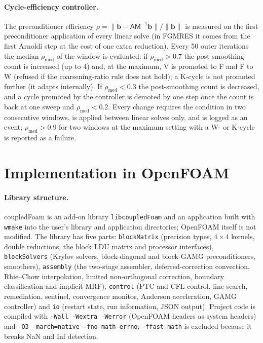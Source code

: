 \documentclass[11pt,a4paper]{article}
\newcommand{\vect}[1]{\mathbf{#1}}
\newcommand{\code}[1]{\texttt{#1}}
\begin{document}
\paragraph{Cycle-efficiency controller.} The preconditioner efficiency
$\rho=\|\vect b-\mathsf A\mathsf M^{-1}\vect b\|/\|\vect b\|$ is measured on the
first preconditioner application of every linear solve (in FGMRES it comes
from the first Arnoldi step at the cost of one extra reduction). Every 50
outer iterations the median $\rho_{\mathrm{med}}$ of the window is evaluated:
if $\rho_{\mathrm{med}}>0.7$ the post-smoothing count is increased (up to 4)
and, at the maximum, V is promoted to F and F to W (refused if the
coarsening-ratio rule does not hold); a K-cycle is not promoted further
(it adapts internally). If $\rho_{\mathrm{med}}<0.3$ the post-smoothing count
is decreased, and a cycle promoted by the controller is demoted by one step
once the count is back at one sweep and $\rho_{\mathrm{med}}<0.2$. Every
change requires the condition in two consecutive windows, is applied between
linear solves only, and is logged as an event; $\rho_{\mathrm{med}}>0.9$ for
two windows at the maximum setting with a W- or K-cycle is reported as a
failure.

\section{Implementation in OpenFOAM}\label{sec:impl}

\paragraph{Library structure.} coupledFoam is an add-on library
\code{libcoupledFoam} and an application built with \code{wmake} into the
user's library and application directories; OpenFOAM itself is not modified.
The library has five parts:
\code{blockMatrix} (precision types, $4\times4$ kernels, double reductions,
the block LDU matrix and processor interfaces),
\code{blockSolvers} (Krylov solvers, block-diagonal and block-GAMG
preconditioners, smoothers),
\code{assembly} (the two-stage assembler, deferred-correction convection,
Rhie--Chow interpolation, limited non-orthogonal correction, boundary
classification and implicit MRF),
\code{control} (PTC and CFL control, line search, remediation, sentinel,
convergence monitor, Anderson acceleration, GAMG controller) and
\code{io} (restart state, run information, JSON output). Project code is
compiled with \code{-Wall -Wextra -Werror} (OpenFOAM headers as system
headers) and \code{-O3 -march=native -fno-math-errno}; \code{-ffast-math} is
excluded because it breaks NaN and Inf detection.
\end{document}
